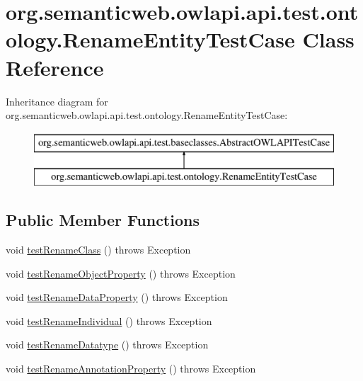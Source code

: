 \hypertarget{classorg_1_1semanticweb_1_1owlapi_1_1api_1_1test_1_1ontology_1_1_rename_entity_test_case}{\section{org.\-semanticweb.\-owlapi.\-api.\-test.\-ontology.\-Rename\-Entity\-Test\-Case Class Reference}
\label{classorg_1_1semanticweb_1_1owlapi_1_1api_1_1test_1_1ontology_1_1_rename_entity_test_case}
}
Inheritance diagram for org.\-semanticweb.\-owlapi.\-api.\-test.\-ontology.\-Rename\-Entity\-Test\-Case\-:\begin{figure}[H]
\begin{center}
\leavevmode
\includegraphics[height=2.000000cm]{classorg_1_1semanticweb_1_1owlapi_1_1api_1_1test_1_1ontology_1_1_rename_entity_test_case}
\end{center}
\end{figure}
\subsection*{Public Member Functions}
\begin{DoxyCompactItemize}
\item 
void \hyperlink{classorg_1_1semanticweb_1_1owlapi_1_1api_1_1test_1_1ontology_1_1_rename_entity_test_case_a651f8270b15fc572990939138ebfbbbb}{test\-Rename\-Class} ()  throws Exception 
\item 
void \hyperlink{classorg_1_1semanticweb_1_1owlapi_1_1api_1_1test_1_1ontology_1_1_rename_entity_test_case_a203f4f2e92561d5f5d8afc89b15d28ec}{test\-Rename\-Object\-Property} ()  throws Exception 
\item 
void \hyperlink{classorg_1_1semanticweb_1_1owlapi_1_1api_1_1test_1_1ontology_1_1_rename_entity_test_case_a656e67010270e3d004fd2952dba6a769}{test\-Rename\-Data\-Property} ()  throws Exception 
\item 
void \hyperlink{classorg_1_1semanticweb_1_1owlapi_1_1api_1_1test_1_1ontology_1_1_rename_entity_test_case_a9493b1b6f1fad2cdceec8b520bc416b8}{test\-Rename\-Individual} ()  throws Exception 
\item 
void \hyperlink{classorg_1_1semanticweb_1_1owlapi_1_1api_1_1test_1_1ontology_1_1_rename_entity_test_case_ad630a523425a7d45d23a00499536db89}{test\-Rename\-Datatype} ()  throws Exception 
\item 
void \hyperlink{classorg_1_1semanticweb_1_1owlapi_1_1api_1_1test_1_1ontology_1_1_rename_entity_test_case_a49c1a409df1c9ca15d5b1a5e18a58a41}{test\-Rename\-Annotation\-Property} ()  throws Exception 
\end{DoxyCompactItemize}
